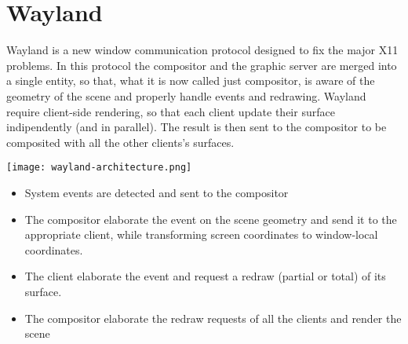 \section{Wayland}
Wayland is a new window communication protocol designed to fix the major X11 problems. In this protocol the compositor and the graphic server are merged into a single entity, so that, what it is now called just compositor, is aware of the geometry of the scene and properly handle events and redrawing. Wayland require client-side rendering, so that each client update their surface indipendently (and in parallel). The result is then sent to the compositor to be composited with all the other clients's surfaces.
\begin{multicols}{2}
\vspace*{\fill}
\centering
\texttt{[image: wayland-architecture.png]}\\
\label{pinki}
\vspace*{\fill}
\columnbreak
\vspace*{\fill}
\begin{itemize}
	\item[1] System events are detected and sent to the compositor
	\item[2] The compositor elaborate the event on the scene geometry and send it to the appropriate client, while transforming screen coordinates to window-local coordinates.
	\item[3] The client elaborate the event and request a redraw (partial or total) of its surface.
	\item[4] The compositor elaborate the redraw requests of all the clients and render the scene
\end{itemize}
\vspace*{\fill}
\end{multicols}